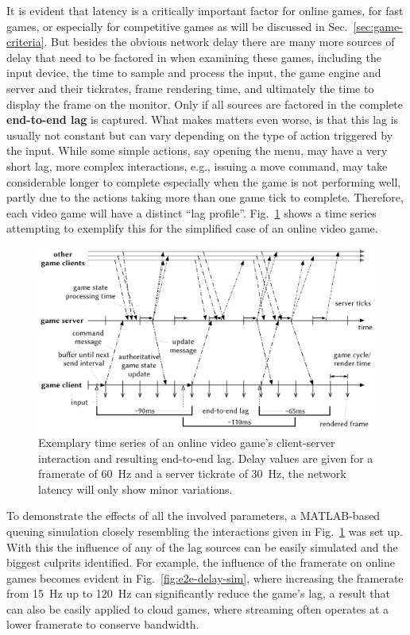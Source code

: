 It is evident that latency is a critically important factor for online 
games, for fast games, or especially for competitive games as will be 
discussed in Sec.~\ref{sec:game-criteria}. But besides the obvious 
network delay there are many more sources of delay that need to be 
factored in when examining these games, including the input device, the 
time to sample and process the input, the game engine and server and 
their tickrates, frame rendering time, and ultimately the time to 
display the frame on the monitor. Only if all sources are factored in 
the complete \textbf{end-to-end lag} is captured. What makes matters 
even worse, is that this lag is usually not constant but can vary 
depending on the type of action triggered by the input. While some 
simple actions, say opening the menu, may have a very short lag, more 
complex interactions, e.g., issuing a move command, may take 
considerable longer to complete especially when the game is not 
performing well, partly due to the actions taking more than one game 
tick to complete. Therefore, each video game will have a distinct ``lag 
profile''.  Fig.~\ref{fig:tickrate-timeseries} shows a time series 
attempting to exemplify this for the simplified case of an online video 
game.


\begin{figure}[!t]
	\centering
	\includegraphics[width=1.0\columnwidth]{images/tickrate-timeseries.pdf}
	\caption{Exemplary time series of an online video game's client-server 
interaction and resulting end-to-end lag. Delay values are given for a 
framerate of \SI{60}{\hertz} and a server tickrate of \SI{30}{\hertz}, 
the network latency will only show minor variations.}
\label{fig:tickrate-timeseries}
\end{figure}

To demonstrate the effects of all the involved parameters, a 
MATLAB-based queuing simulation closely resembling the interactions 
given in Fig.~\ref{fig:tickrate-timeseries} was set up. With this the 
influence of any of the lag sources can be easily simulated and the 
biggest culprits identified. For example, the influence of the 
framerate on online games becomes evident in 
Fig.~\ref{fig:e2e-delay-sim}, where increasing the framerate from 
\SI{15}{\hertz} up to \SI{120}{\hertz} can significantly reduce the 
game's lag, a result that can also be easily applied to cloud games, 
where streaming often operates at a lower framerate to conserve 
bandwidth.

